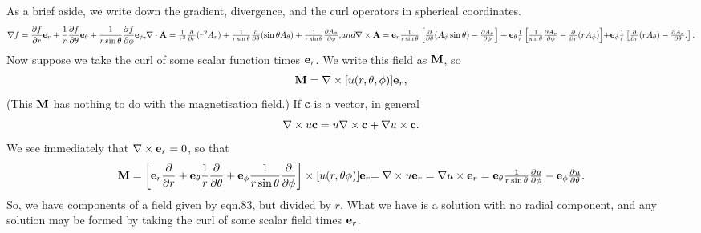 \documentclass[12pt]{article}
\begin{document}
As a brief aside, we write down the gradient, divergence, and the curl
operators in spherical coordinates.
\begin{equation}
\nabla f=
\frac{\partial f}{\partial r}{\bf e}_r
+ \frac{1}{r} \frac{\partial f}{\partial \theta}{\bf e}_\theta
+ \frac{1}{r \sin \theta} \frac{\partial f}{\partial \phi}
{\bf e}_\phi,
$$    $$
\nabla \cdot {\bf A}
=\frac{1}{r^2} \frac{\partial }{\partial r} (r^2 A_r)
+\frac{1}{r \sin \theta} \frac{\partial }{\partial \theta}
( \sin \theta A_\theta )
+\frac{1}{r \sin \theta} \frac{\partial A_\phi}{\partial \phi},
$$   and $$
\nabla \times {\bf A}=
{\bf e}_r \frac{1}{r \sin \theta} \left \lbrack
\frac{\partial}{\partial \theta} (A_\phi \sin \theta)
-\frac{\partial A_\theta}{\partial \phi}
\right \rbrack
+{\bf e}_\theta \frac{1}{r}  \left \lbrack
 \frac{1}{ \sin \theta}\frac{\partial A_r}{\partial \phi} 
-\frac{\partial}{\partial r} ( r A_\phi)
\right \rbrack
$$    $$
+{\bf e}_\phi \frac{1}{r}  \left \lbrack
 \frac{\partial }{\partial r} (r A_\theta)
-\frac{\partial A_r}{\partial \theta}. 
\right \rbrack.
\end{equation}
Now suppose we take the curl of some scalar function times
${\bf e}_r$. We write this field as ${\bf M}$, so
\begin{equation}
{\bf M}=\nabla \times [u(r, \theta, \phi) ]{\bf e}_r,
\end{equation}
(This ${\bf M}$  has nothing to do with the magnetisation field.)
If {\bf c} is a vector, in general
\begin{equation}
\nabla \times u {\bf c}=u \nabla \times {\bf c}
+ \nabla u \times {\bf c}.
\end{equation}
We see immediately that $ \nabla \times {\bf e}_r=0$, so that 
\begin{equation}
{\bf M}=\left \lbrack
{\bf e}_r \frac{\partial }{\partial r}
+{\bf e}_\theta \frac{1}{r}\frac{\partial}{\partial \theta}
+{\bf e}_\phi \frac{1}{r \sin \theta}\frac{\partial}{\partial \phi}
\right \rbrack \times [u(r, \theta \phi )] {\bf e}_r
$$    $$
= \nabla \times u {\bf e}_r=\nabla u \times{\bf e}_r
={\bf e}_\theta \frac{1}{r \sin \theta}
\frac{\partial u}{\partial \phi}-
 {\bf e}_\phi \frac{\partial u}{\partial \theta}.
\end{equation}
So, we have components of a field given by eqn.83, but 
divided by $r$. What we have is a solution with no radial component,
 and any solution may be formed by taking the curl of some scalar
 field times ${\bf e}_r$.
\end{document}
